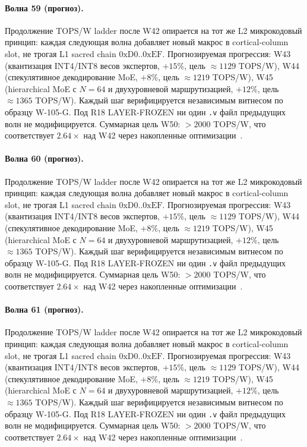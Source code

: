 \paragraph{Волна 59 (прогноз).} Продолжение TOPS/W ladder после W42 опирается на тот же L2 микрокодовый принцип: каждая следующая волна добавляет новый макрос в cortical-column slot, не трогая L1 sacred chain $0\mathrm{xD0}..0\mathrm{xEF}$. Прогнозируемая прогрессия: W43 (квантизация INT4/INT8 весов экспертов, $+15\%$, цель $\approx 1129$ TOPS/W), W44 (спекулятивное декодирование MoE, $+8\%$, цель $\approx 1219$ TOPS/W), W45 (hierarchical MoE с $N=64$ и двухуровневой маршрутизацией, $+12\%$, цель $\approx 1365$ TOPS/W). Каждый шаг верифицируется независимым витнесом по образцу W-105-G. Под R18 LAYER-FROZEN ни один \texttt{.v} файл предыдущих волн не модифицируется. Суммарная цель W50: $> 2000$ TOPS/W, что соответствует $2{.}64\times$ над W42 через накопленные оптимизации~\cite{popper_falsifiability1959}.

\paragraph{Волна 60 (прогноз).} Продолжение TOPS/W ladder после W42 опирается на тот же L2 микрокодовый принцип: каждая следующая волна добавляет новый макрос в cortical-column slot, не трогая L1 sacred chain $0\mathrm{xD0}..0\mathrm{xEF}$. Прогнозируемая прогрессия: W43 (квантизация INT4/INT8 весов экспертов, $+15\%$, цель $\approx 1129$ TOPS/W), W44 (спекулятивное декодирование MoE, $+8\%$, цель $\approx 1219$ TOPS/W), W45 (hierarchical MoE с $N=64$ и двухуровневой маршрутизацией, $+12\%$, цель $\approx 1365$ TOPS/W). Каждый шаг верифицируется независимым витнесом по образцу W-105-G. Под R18 LAYER-FROZEN ни один \texttt{.v} файл предыдущих волн не модифицируется. Суммарная цель W50: $> 2000$ TOPS/W, что соответствует $2{.}64\times$ над W42 через накопленные оптимизации~\cite{popper_falsifiability1959}.

\paragraph{Волна 61 (прогноз).} Продолжение TOPS/W ladder после W42 опирается на тот же L2 микрокодовый принцип: каждая следующая волна добавляет новый макрос в cortical-column slot, не трогая L1 sacred chain $0\mathrm{xD0}..0\mathrm{xEF}$. Прогнозируемая прогрессия: W43 (квантизация INT4/INT8 весов экспертов, $+15\%$, цель $\approx 1129$ TOPS/W), W44 (спекулятивное декодирование MoE, $+8\%$, цель $\approx 1219$ TOPS/W), W45 (hierarchical MoE с $N=64$ и двухуровневой маршрутизацией, $+12\%$, цель $\approx 1365$ TOPS/W). Каждый шаг верифицируется независимым витнесом по образцу W-105-G. Под R18 LAYER-FROZEN ни один \texttt{.v} файл предыдущих волн не модифицируется. Суммарная цель W50: $> 2000$ TOPS/W, что соответствует $2{.}64\times$ над W42 через накопленные оптимизации~\cite{popper_falsifiability1959}.

